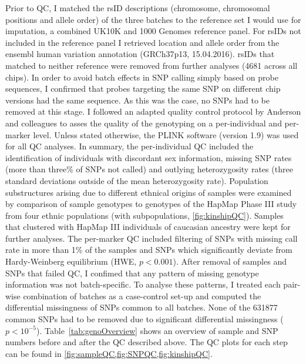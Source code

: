 Prior to QC, I matched the rsID descriptions (chromosome, chromosomal positions and allele order) of the three batches to the reference set I would use for imputation, a combined UK10K \citep{UK10KConsortium2014} and \num{1000} Genomes \citep{Abecasis2012} reference panel. For rsIDs not included in the reference panel I retrieved location and allele order from the ensembl human variation annotation (GRCh37p13, 15.04.2016). rsIDs that matched to neither reference were removed from further analyses (\num{4681} across all chips). In order to avoid batch effects in SNP calling simply based on probe sequences, I confirmed that probes targeting the same SNP on different chip versions had the same sequence. As this was the case, no SNPs had to be removed at this stage. 
I followed an adapted quality control protocol by Anderson and colleagues \citep{Anderson2010} to asses the quality of the genotyping on a per-individual and per-marker level. Unless stated otherwise, the PLINK software (version 1.9) \citep{Purcell2007, Chang2015} was used for all QC analyses. In summary, the per-individual QC included the identification of individuals with discordant sex information, missing SNP rates (more than three\% of SNPs not called) and outlying heterozygosity rates (three standard deviations outside of the mean heterozygosity rate). Population substructures arising due to different ethnical origins of samples were examined by comparison of sample genotypes to genotypes of the HapMap Phase III study \citep{HapMap2005} from four ethnic populations (with subpopulations, \cref{fig:kinshipQC}). Samples that clustered with HapMap III individuals of caucasian ancestry were kept for further analyses. The per-marker QC included filtering of SNPs with missing call rate in more than \num{1}\% of the samples and SNPs which significantly deviate from Hardy-Weinberg equilibrium (HWE, \(p < 0.001\)). After removal of samples and SNPs that failed QC, I confimed that any pattern of missing genotype information was not batch-specific. To analyse these patterns, I treated each pair-wise combination of batches as a case-control set-up and computed the differential missingness of SNPs common to all batches. None of the \num{631877} common SNPs had to be removed due to significant differential missingness (\(p < 10^{-5}\)). Table~\ref{tab:genoOverview} shows an overview of sample and SNP numbers before and after the QC described above. The QC plots for each step can be found in \cref{fig:sampleQC,fig:SNPQC,fig:kinshipQC}. 
\\
